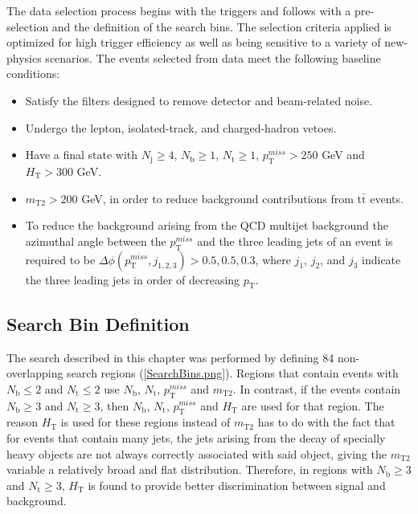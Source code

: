 The data selection process begins with the triggers and follows with a pre-selection and the definition of the search bins. The selection criteria applied is optimized for high trigger efficiency as well as being sensitive to a variety of new-physics scenarios. The events selected from data meet the following baseline conditions:\\
 
\begin{itemize}
	\item{Satisfy the filters designed to remove detector and beam-related noise.}
	\item{Undergo the lepton, isolated-track, and charged-hadron vetoes.}
	\item{Have a final state with $N_\text{j} \geq 4$, $N_\text{b} \geq 1$, $N_\text{t} \geq 1$, $p_{\text{T}}^{miss} > 250$ GeV and $H_\text{T} > 300$ GeV.}
	\item{$m_\text{T2} > 200$ GeV, in order to reduce background contributions from t$\bar{\text{t}}$ events.}
	\item{To reduce the background arising from the QCD multijet background the azimuthal angle between the $p_{\text{T}}^{miss}$ and the three leading jets of an event is required to be $\Delta\phi(p_{\text{T}}^{miss},j_{1,2,3}) > 0.5, 0.5, 0.3$, where $j_1$, $j_2$, and $j_3$ indicate the three leading jets in order of decreasing $p_\text{T}$.}
\end{itemize}

\subsection{Search Bin Definition}\label{SearchBinDef}

The search described in this chapter was performed by defining 84 non-overlapping search regions (\autoref{SearchBins.png}). Regions that contain events with $N_\text{b} \leq 2$ and $N_\text{t} \leq 2$ use  $N_\text{b}$, $N_\text{t}$, $p_{\text{T}}^{miss}$ and $m_\text{T2}$. In contrast, if the events contain $N_\text{b} \geq 3$ and $N_\text{t} \geq 3$, then $N_\text{b}$, $N_\text{t}$, $p_{\text{T}}^{miss}$ and $H_\text{T}$ are used for that region. The reason $H_\text{T}$ is used for these regions instead of $m_\text{T2}$ has to do with the fact that for events that contain many jets, the jets arising from the decay of specially heavy objects are not always correctly associated with said object, giving the $m_\text{T2}$ variable a relatively broad and flat distribution. Therefore, in regions with $N_\text{b} \geq 3$ and $N_\text{t} \geq 3$, $H_\text{T}$ is found to provide better discrimination between signal and background.

